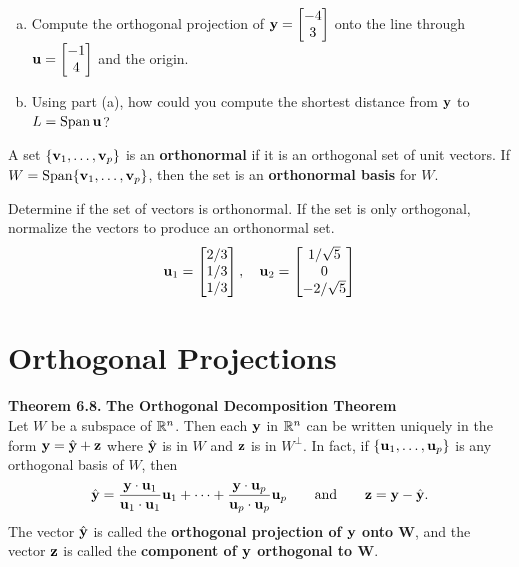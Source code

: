 \begin{exercise} %
	\begin{enumerate}[(a)]
		\item Compute the orthogonal projection of $\vect{y}=\begin{bmatrix}-4\\3\end{bmatrix}$ onto the line through $\vect{u}=\begin{bmatrix}-1\\4\end{bmatrix}$ and the origin.
		\vfill
		
		\item Using part (a), how could you compute the shortest distance from $\vect{y}$ to $L=\Span{\vect{u}}$?
		\vspace{3em}
	\end{enumerate}
\end{exercise}


\begin{boxdef}
	A set $\vectsetvp$ is an \textbf{orthonormal} if it is an orthogonal set of unit vectors. If $W=\Span\vectsetvp$, then the set is an \textbf{orthonormal basis} for $W$.
\end{boxdef}

\begin{exercise} %
	Determine if the set of vectors is orthonormal. If the set is only orthogonal, normalize the vectors to produce an orthonormal set.
	$$ \vect{u}_1 = \begin{bmatrix}2/3\\1/3\\1/3\end{bmatrix}, \quad
	\vect{u}_2 = \begin{bmatrix}1/\sqrt{5}\\0\\-2/\sqrt{5}\end{bmatrix} $$
\end{exercise}
\vfill


\newpage


\section{Orthogonal Projections}
\name

\begin{boxthm}
	\textbf{Theorem 6.8.}
	\textbf{The Orthogonal Decomposition Theorem} \\
	Let $W$ be a subspace of $\R^n$. Then each $\vect{y}$ in $\R^n$ can be written uniquely in the form
	$ \vect{y} = \yhat+\vect{z} $
	where $\yhat$ is in $W$ and $\vect{z}$ is in $W^\perp$. In fact, if $\vectset[u]{1}{p}$ is any orthogonal basis of $W$, then
	$$ \yhat = \frac{\vect{y}\cdot\vect{u}_1}{\vect{u}_1\cdot\vect{u}_1}\vect{u}_1 + \cdots + \frac{\vect{y}\cdot\vect{u}_p}{\vect{u}_p\cdot\vect{u}_p}\vect{u}_p \qquad \text{and} \qquad \vect{z}=\vect{y}-\yhat. $$
	The vector $\yhat$ is called the \textbf{orthogonal projection of $\boldsymbol{\vect{y}}$ onto $\boldsymbol{W}$}, and the vector $\vect{z}$ is called the \textbf{component of $\boldsymbol{\vect{y}}$ orthogonal to $\boldsymbol{W}$}.
\end{boxthm}


